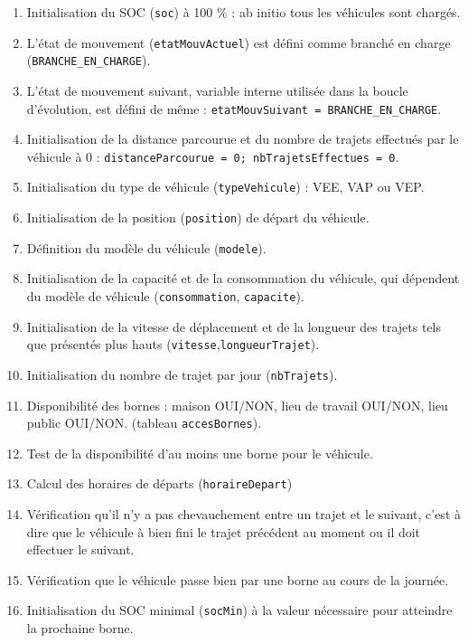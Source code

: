 \documentclass[10pt]{article}
\begin{document}
			\begin{enumerate}
				\item Initialisation du SOC (\texttt{soc}) à 100 $\percent$ : ab initio tous les véhicules sont chargés.
				\item L'état de mouvement (\texttt{etatMouvActuel}) est défini comme branché en charge (\texttt{BRANCHE\_EN\_CHARGE}).
				\item L'état de mouvement suivant, variable interne utilisée dans la boucle d'évolution, est défini de même : \texttt{etatMouvSuivant = BRANCHE\_EN\_CHARGE}.
				\item Initialisation de la distance parcourue et du nombre de trajets effectués par le véhicule à 0 : \texttt{distanceParcourue = 0; nbTrajetsEffectues = 0}.
				\item Initialisation du type de véhicule (\texttt{typeVehicule}) : VEE, VAP ou VEP.
				\item Initialisation de la position (\texttt{position}) de départ du véhicule.
				\item Définition du modèle du véhicule (\texttt{modele}).
				\item Initialisation de la capacité et de la consommation du véhicule, qui dépendent du modèle de véhicule (\texttt{consommation}, \texttt{capacite}).
				\item Initialisation de la vitesse de déplacement et de la longueur des trajets tels que présentés plus hauts (\texttt{vitesse},\texttt{longueurTrajet}).
				\item Initialisation du nombre de trajet par jour (\texttt{nbTrajets}).
				\item Disponibilité des bornes : maison OUI/NON, lieu de travail OUI/NON, lieu public OUI/NON. (tableau \texttt{accesBornes}).
				\item Test de la disponibilité d'au moins une borne pour le véhicule.
				\item Calcul des horaires de départs (\texttt{horaireDepart})
				\item Vérification qu'il n'y a pas chevauchement entre un trajet et le suivant, c'est à dire que le véhicule à bien fini le trajet précédent au moment ou il doit effectuer le suivant.
				\item Vérification que le véhicule passe bien par une borne au cours de la journée.
				\item Initialisation du SOC minimal (\texttt{socMin}) à la valeur nécessaire pour atteindre la prochaine borne.
			\end{enumerate}	
	
\end{document}
